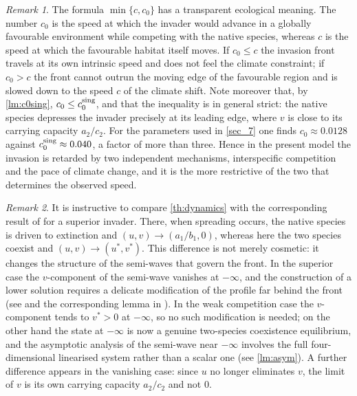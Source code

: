 \documentclass[reqno]{amsart}
\theoremstyle{plain}
\theoremstyle{definition}
\theoremstyle{remark}
\newtheorem{remark}{Remark}
\begin{document}
\begin{remark}\label{rm:speed}
	The formula $\min\{c,c_0\}$ has a transparent ecological meaning. The number
	$c_0$ is the speed at which the invader would advance in a globally
	favourable environment while competing with the native species, whereas $c$
	is the speed at which the favourable habitat itself moves. If $c_0\le c$ the
	invasion front travels at its own intrinsic speed and does not feel the
	climate constraint; if $c_0>c$ the front cannot outrun the moving edge of the
	favourable region and is slowed down to the speed $c$ of the climate shift.
	Note moreover that, by \cref{lm:c0sing}, $c_0\le c_0^{\rm sing}$, and that the
	inequality is in general strict: the native species depresses the invader
	precisely at its leading edge, where $v$ is close to its carrying capacity
	$a_2/c_2$. For the parameters used in \cref{sec_7} one finds
	$c_0\approx0.0128$ against $c_0^{\rm sing}\approx0.040$, a factor of more than
	three. Hence in the present model the invasion is retarded by two independent
	mechanisms, interspecific competition and the pace of climate change, and
	it is the more restrictive of the two that determines the observed speed.
\end{remark}

\begin{remark}\label{rm:compare}
	It is instructive to compare \cref{th:dynamics} with the corresponding result
	of \cite{DLN2026a} for a superior invader. There, when spreading occurs, the
	native species is driven to extinction and $(u,v)\to(a_1/b_1,0)$, whereas here
	the two species coexist and $(u,v)\to(u^*,v^*)$. This difference is not
	merely cosmetic: it changes the structure of the semi-waves that govern the
	front. In the superior case the $v$-component of the semi-wave vanishes at
	$-\infty$, and the construction of a lower solution requires a delicate
	modification of the profile far behind the front (see
	\cite[Lemma 3.3]{MR3609207} and the corresponding lemma in \cite{DLN2026a}). In
	the weak competition case the $v$-component tends to $v^*>0$ at $-\infty$,
	so no such modification is needed; on the other hand the state at $-\infty$ is
	now a genuine two-species coexistence equilibrium, and the asymptotic analysis
	of the semi-wave near $-\infty$ involves the full four-dimensional linearised
	system rather than a scalar one (see \cref{lm:asym}). A further difference
	appears in the vanishing case: since $u$ no longer eliminates $v$, the limit
	of $v$ is its own carrying capacity $a_2/c_2$ and not $0$.
\end{remark}
\end{document}
